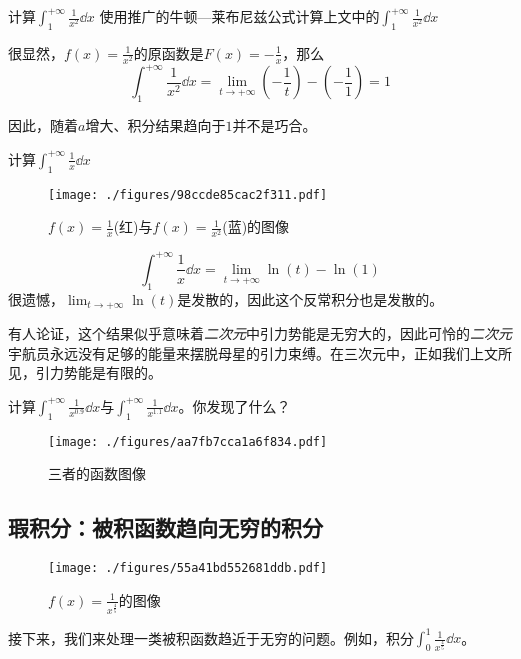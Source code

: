 \begin{example}{计算$\int^{+\infty}_1 \frac{1}{x^2} \dd x$}
使用推广的牛顿—莱布尼兹公式计算上文中的$\int^{+\infty}_1 \frac{1}{x^2} \dd x$

很显然，$f(x)=\frac{1}{x^2}$的原函数是$F(x)=-\frac{1}{x}$，那么
$$\int^{+\infty}_1 \frac{1}{x^2} \dd x=\lim_{t\rightarrow+\infty } (-\frac{1}{t}) - (-\frac{1}{1})=1$$

因此，随着$a$增大、积分结果趋向于$1$并不是巧合。
\end{example}

\begin{example}{计算$\int^{+\infty}_1 \frac{1}{x} \dd x$}
\begin{figure}[ht]
\centering
\texttt{[image: ./figures/98ccde85cac2f311.pdf]}
\caption{$f(x) = \frac{1}{x}$(红)与$f(x) = \frac{1}{x^2}$(蓝)的图像} \label{fig_impro_3}
\end{figure}

$$\int^{+\infty}_1 \frac{1}{x} \dd x=\lim_{t\rightarrow+\infty } {\ln(t)} - \ln(1)$$
很遗憾，$\lim_{t\rightarrow+\infty } {\ln(t)} $是发散的，因此这个反常积分也是发散的。

有人论证，这个结果似乎意味着\textsl{二次元}中引力势能是无穷大的，因此可怜的\textsl{二次元}宇航员永远没有足够的能量来摆脱母星的引力束缚。在三次元中，正如我们上文所见，引力势能是有限的。

\end{example}

\begin{exercise}{}
计算$\int^{+\infty}_1 \frac{1}{x^{0.9}} \dd x$与$\int^{+\infty}_1 \frac{1}{x^{1.1}} \dd x$。你发现了什么？
\begin{figure}[ht]
\centering
\texttt{[image: ./figures/aa7fb7cca1a6f834.pdf]}
\caption{三者的函数图像} \label{fig_impro_4}
\end{figure}
\end{exercise}

\subsection{瑕积分：被积函数趋向无穷的积分}
\begin{figure}[ht]
\centering
\texttt{[image: ./figures/55a41bd552681ddb.pdf]}
\caption{$f(x)=\frac{1}{x^{\frac{4}{5}}}$的图像} \label{fig_impro_1}
\end{figure}
接下来，我们来处理一类被积函数趋近于无穷的问题。例如，积分$\int_0^1 \frac{1}{x^{\frac{4}{5}}} \dd x$。

